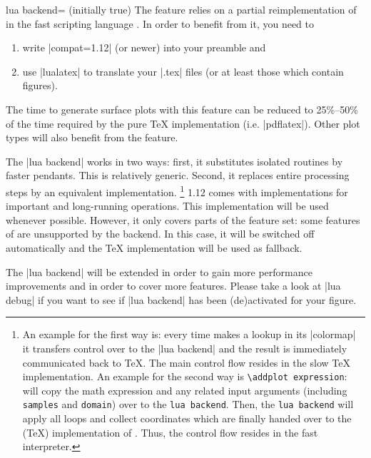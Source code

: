 {\begin{pgfplotskey}{lua backend= (initially true)}
    The feature relies on a partial reimplementation of \PGFPlots{} in the fast
    scripting language \lua. In order to benefit from it, you need to
    \begin{enumerate}
        \item write |compat=1.12| (or newer) into your preamble and
        \item use |lualatex| to translate your |.tex| files (or at least
            those which contain \PGFPlots{} figures).
    \end{enumerate}

    The time to generate surface plots with this feature can be reduced to
    25\%--50\% of the time required by the pure \TeX{} implementation (i.e.\@
    |pdflatex|). Other plot types will also benefit from the feature.

    The |lua backend| works in two ways: first, it substitutes isolated
    routines by faster \lua{} pendants. This is relatively generic. Second, it
    replaces entire processing steps by an equivalent \lua{} implementation.%
    \footnote{
        An example for the first way is: every time \PGFPlots{} makes a lookup
        in its |colormap| it transfers control over to the |lua backend| and
        the result is immediately communicated back to \TeX{}. The main control
        flow resides in the slow \TeX{} implementation. An example for the
        second way is \texttt{\textbackslash addplot expression}: \PGFPlots{}
        will copy the math expression and any related input arguments
        (including  \texttt{samples} and \texttt{domain}) over to the
        \texttt{lua backend}. Then, the \texttt{lua backend} will apply all
        loops and collect coordinates which are finally handed over to the
        (\TeX{}) implementation of \pgfname{}. Thus, the control flow resides
        in the fast \lua{} interpreter.
    }
    \PGFPlots{} 1.12 comes with \lua{} implementations for important and
    long-running operations. This implementation will be used whenever
    possible. However, it only covers parts of the feature set: some features
    of \PGFPlots{} are unsupported by the \lua{} backend. In this case, it will
    be switched off automatically and the \TeX{} implementation will be used as
    fallback.

    The |lua backend| will be extended in order to gain more performance
    improvements and in order to cover more features. Please take a look at
    |lua debug| if you want to see if |lua backend| has been (de)activated for
    your figure.


\end{pgfplotskey}}
